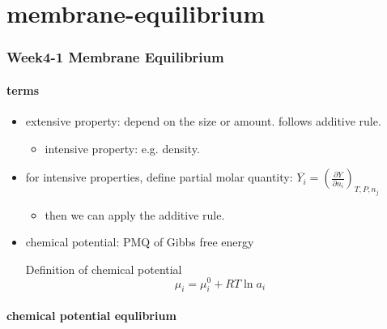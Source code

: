 \chapter{membrane-equilibrium}


\hypertarget{week4-1-membrane-equilibrium}{%
	\subsection{Week4-1 Membrane
		Equilibrium}\label{week4-1-membrane-equilibrium}}

\hypertarget{terms}{%
	\subsubsection{terms}\label{terms}}

\begin{itemize}
	\item
	extensive property: depend on the size or amount. follows additive rule.
	
	\begin{itemize}
		\item
		intensive property: e.g. density. 
	\end{itemize}
	\item
	for intensive properties, define partial molar quantity:
	\(\overline{Y_i}=\left(\frac{\partial Y}{\partial n_i}\right)_{T,P,n_j}\)
	
	\begin{itemize}
		\item
		then we can apply the additive rule.
	\end{itemize}
	\item
	chemical potential: PMQ of Gibbs free energy
	\begin{theorem*}{Definition of chemical potential}{}
		\[\mu_i=\mu_i^0+RT\ln a_i\]
	\end{theorem*}
	
\end{itemize}


\hypertarget{chemical-potential-equlibrium}{%
	\subsubsection{chemical potential
		equlibrium}\label{chemical-potential-equlibrium}}

